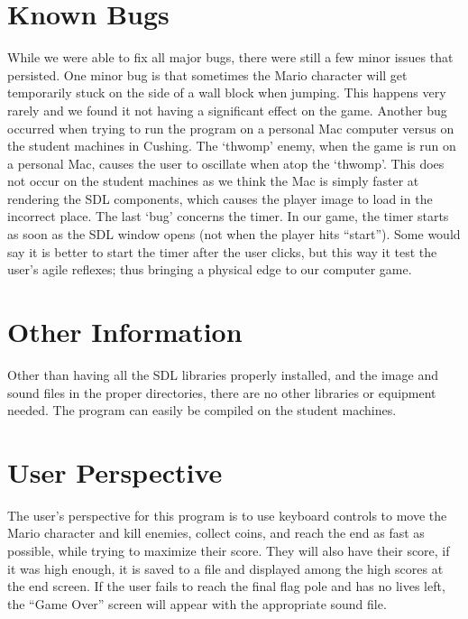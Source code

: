 \documentclass[letterpaper]{article}
\begin{document}
\section*{Known Bugs}

While we were able to fix all major bugs, there were still a few minor issues that persisted. One minor bug is that sometimes the Mario character will get temporarily stuck on the side of a wall block when jumping. This happens very rarely and we found it not having a significant effect on the game. Another bug occurred when trying to run the program on a personal Mac computer versus on the student machines in Cushing. The ‘thwomp’ enemy, when the game is run on a personal Mac, causes the user to oscillate when atop the ‘thwomp’. This does not occur on the student machines as we think the Mac is simply faster at rendering the SDL components, which causes the player image to load in the incorrect place. The last ‘bug’ concerns the timer. In our game, the timer starts as soon as the SDL window opens (not when the player hits “start”). Some would say it is better to start the timer after the user clicks, but this way it test the user’s agile reflexes; thus bringing a physical edge to our computer game.

\section*{Other Information}

Other than having all the SDL libraries properly installed, and the image and sound files in the proper directories, there are no other libraries or equipment needed. The program can easily be compiled on the student machines. 

\section*{User Perspective}

The user’s perspective for this program is to use keyboard controls to move the Mario character and kill enemies, collect coins, and reach the end as fast as possible, while trying to maximize their score. They will also have their score, if it was high enough, it is saved to a file and displayed among the high scores at the end screen. If the user fails to reach the final flag pole and has no lives left, the “Game Over” screen will appear with the appropriate sound file.
\end{document}
